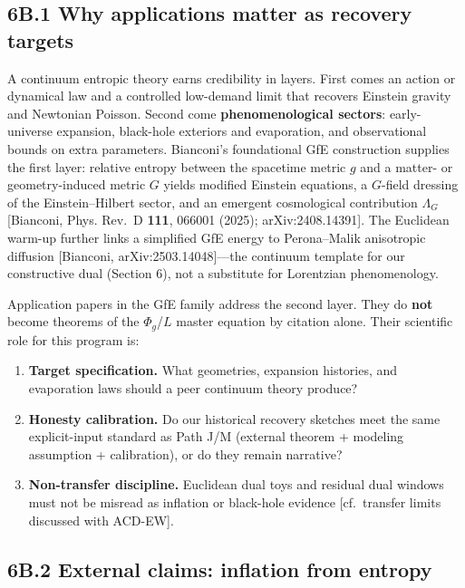 \documentclass[
  11pt,
]{article}
\providecommand{\tightlist}{%
  \setlength{\itemsep}{0pt}\setlength{\parskip}{0pt}}
\begin{document}
\subsection{6B.1 Why applications matter as recovery
targets}\label{b.1-why-applications-matter-as-recovery-targets}

A continuum entropic theory earns credibility in layers. First comes an
action or dynamical law and a controlled low-demand limit that recovers
Einstein gravity and Newtonian Poisson. Second come
\textbf{phenomenological sectors}: early-universe expansion, black-hole
exteriors and evaporation, and observational bounds on extra parameters.
Bianconi's foundational GfE construction supplies the first layer:
relative entropy between the spacetime metric \(g\) and a matter- or
geometry-induced metric \(G\) yields modified Einstein equations, a
\(G\)-field dressing of the Einstein--Hilbert sector, and an emergent
cosmological contribution \(\Lambda_G\) [Bianconi, Phys. Rev.~D
\textbf{111}, 066001 (2025); arXiv:2408.14391]. The Euclidean warm-up
further links a simplified GfE energy to Perona--Malik anisotropic
diffusion [Bianconi, arXiv:2503.14048]---the continuum template for
our constructive dual (Section 6), not a substitute for Lorentzian
phenomenology.

Application papers in the GfE family address the second layer. They do
\textbf{not} become theorems of the \(\Phi_g\)/\(L\) master equation by
citation alone. Their scientific role for this program is:

\begin{enumerate}
\def\labelenumi{\arabic{enumi}.}
\tightlist
\item
  \textbf{Target specification.} What geometries, expansion histories,
  and evaporation laws should a peer continuum theory produce?
\item
  \textbf{Honesty calibration.} Do our historical recovery sketches meet
  the same explicit-input standard as Path J/M (external theorem +
  modeling assumption + calibration), or do they remain narrative?
\item
  \textbf{Non-transfer discipline.} Euclidean dual toys and residual
  dual windows must not be misread as inflation or black-hole evidence
  [cf.~transfer limits discussed with ACD-EW].
\end{enumerate}

\subsection{6B.2 External claims: inflation from
entropy}\label{b.2-external-claims-inflation-from-entropy}
\end{document}

